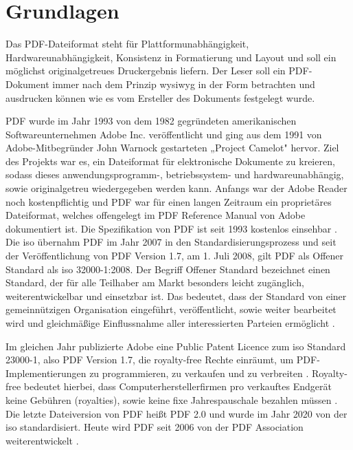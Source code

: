 \chapter{Grundlagen}
Das PDF-Dateiformat steht für Plattformunabhängigkeit, Hardwareunabhängigkeit, Konsistenz in Formatierung und Layout und soll ein möglichst originalgetreues Druckergebnis liefern. Der Leser soll ein PDF-Dokument immer nach dem Prinzip \gls{wysiwyg} in der Form betrachten und ausdrucken können wie es vom Ersteller des Dokuments festgelegt wurde.
\par
PDF wurde im Jahr 1993 von dem 1982 gegründeten amerikanischen Softwareunternehmen Adobe Inc. veröffentlicht und ging aus dem 1991 von Adobe-Mitbegründer John Warnock gestarteten „Project Camelot" hervor\cite{wiki-pdf-de}. Ziel des Projekts war es, ein Dateiformat für elektronische Dokumente zu kreieren, sodass dieses anwendungsprogramm-, betriebssystem- und hardwareunabhängig, sowie originalgetreu wiedergegeben werden kann. Anfangs war der Adobe Reader noch kostenpflichtig und PDF war für einen langen Zeitraum ein proprietäres Dateiformat, welches offengelegt im PDF Reference Manual von Adobe dokumentiert ist. Die Spezifikation von PDF ist seit 1993 kostenlos einsehbar \cite{wiki-pdf-engl}. Die \gls{iso} übernahm PDF im Jahr 2007 in den Standardisierungsprozess und seit der Veröffentlichung von PDF Version 1.7, am 1. Juli 2008, gilt PDF als Offener Standard als \gls{iso} 32000-1:2008\cite{wiki-pdf-de, wiki-pdf-engl}. Der Begriff Offener Standard bezeichnet einen Standard, der für alle Teilhaber am Markt besonders leicht zugänglich, weiterentwickelbar und einsetzbar ist. Das bedeutet, dass der Standard von einer gemeinnützigen Organisation eingeführt, veröffentlicht, sowie weiter bearbeitet wird und gleichmäßige Einflussnahme aller interessierten Parteien ermöglicht \cite{wiki-standard}.
\par
Im gleichen Jahr publizierte Adobe eine Public Patent Licence zum \gls{iso} Standard 23000-1, also PDF Version 1.7, die royalty-free Rechte einräumt, um PDF-Implementierungen zu programmieren, zu verkaufen und zu verbreiten \cite{wiki-pdf-engl}. Royalty-free bedeutet hierbei, dass Computerherstellerfirmen pro verkauftes Endgerät keine Gebühren (royalties), sowie keine fixe Jahrespauschale bezahlen müssen \cite{wiki-roy-free}. Die letzte Dateiversion von PDF heißt PDF 2.0 und wurde im Jahr 2020 von der \gls{iso} standardisiert. Heute wird PDF seit 2006 von der PDF Association weiterentwickelt \cite{wiki-pdf-de}. 









